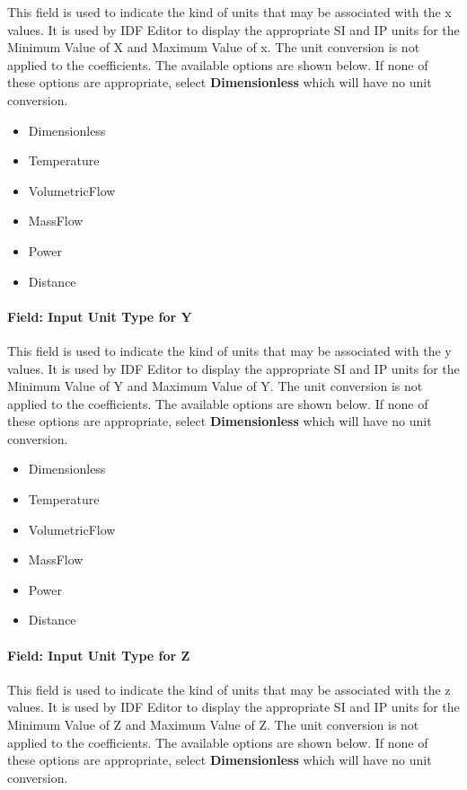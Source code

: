 This field is used to indicate the kind of units that may be associated with the x values. It is used by IDF Editor to display the appropriate SI and IP units for the Minimum Value of X and Maximum Value of x. The unit conversion is not applied to the coefficients. The available options are shown below. If none of these options are appropriate, select \textbf{Dimensionless} which will have no unit conversion.

\begin{itemize}
\item
  Dimensionless
\item
  Temperature
\item
  VolumetricFlow
\item
  MassFlow
\item
  Power
\item
  Distance
\end{itemize}

\paragraph{Field: Input Unit Type for Y}\label{field-input-unit-type-for-y-6}

This field is used to indicate the kind of units that may be associated with the y values. It is used by IDF Editor to display the appropriate SI and IP units for the Minimum Value of Y and Maximum Value of Y. The unit conversion is not applied to the coefficients. The available options are shown below. If none of these options are appropriate, select \textbf{Dimensionless} which will have no unit conversion.

\begin{itemize}
\item
  Dimensionless
\item
  Temperature
\item
  VolumetricFlow
\item
  MassFlow
\item
  Power
\item
  Distance
\end{itemize}

\paragraph{Field: Input Unit Type for Z}\label{field-input-unit-type-for-z-2}

This field is used to indicate the kind of units that may be associated with the z values. It is used by IDF Editor to display the appropriate SI and IP units for the Minimum Value of Z and Maximum Value of Z. The unit conversion is not applied to the coefficients. The available options are shown below. If none of these options are appropriate, select \textbf{Dimensionless} which will have no unit conversion.

